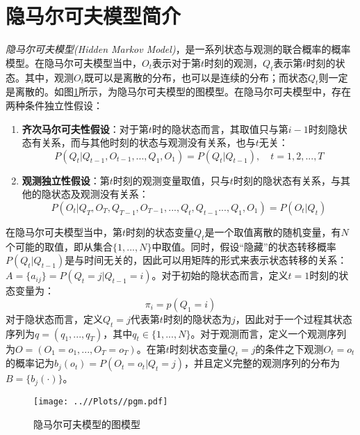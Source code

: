 \documentclass[UTF8, 12pt]{ctexart}
\begin{document}
\section{隐马尔可夫模型简介}
	\emph{隐马尔可夫模型(Hidden Markov Model)}，是一系列状态与观测的联合概率的概率模型\cite{Bilmes1998A}。在隐马尔可夫模型当中，$O_{t}$表示对于第$t$时刻的观测，$Q_{t}$表示第$t$时刻的状态。其中，观测$O_{t}$既可以是离散的分布，也可以是连续的分布；而状态$Q_{t}$则一定是离散的。如图\ref{Fig:1}所示，为隐马尔可夫模型的图模型。在隐马尔可夫模型中，存在两种条件独立性假设：
	\begin{enumerate}
		\item \textbf{齐次马尔可夫性假设}：对于第$t$时的隐状态而言，其取值只与第$i-1$时刻隐状态有关系，而与其他时刻的状态与观测没有关系，也与$t$无关：
		\begin{equation}
			P({Q_t}|{Q_{t - 1}},{O_{t - 1}},...,{Q_1},{O_1}) = P({Q_t}|{Q_{t - 1}}), \quad t=1, 2, ..., T
		\end{equation}
		\item \textbf{观测独立性假设}：第$t$时刻的观测变量取值，只与$t$时刻的隐状态有关系，与其他的隐状态及观测没有关系：
		\begin{equation}
			P({O_t}|{Q_T},{O_T},{Q_{T - 1}},{O_{T - 1}},...,{Q_t},{Q_{t - 1}}...,{Q_1},{O_1}) = P({O_t}|{Q_t})
		\end{equation}
	\end{enumerate}
	在隐马尔可夫模型当中，第$t$时刻的状态变量$Q_{t}$是一个取值离散的随机变量，有$N$个可能的取值，即从集合$ \{1,...,N\}$中取值。同时，假设“隐藏”的状态转移概率$P(Q_{t}|Q_{t-1})$是与时间无关的，因此可以用矩阵的形式来表示状态转移的关系：$A=\{a_{ij}\}=P(Q_{t}=j|Q_{t-1}=i)$。对于初始的隐状态而言，定义$t=1$时刻的状态变量为：
	\begin{equation}
		{\pi_i} = p({Q_1} = i)
	\end{equation}
	对于隐状态而言，定义$Q_{t}=j$代表第$t$时刻的隐状态为$j$，因此对于一个过程其状态序列为$q=(q_{1},...,q_{T})$，其中$q_{t} \in \{1,...,N\}$。对于观测而言，定义一个观测序列为$O=(O_{1}=o_{1},...,O_{T}=o_{T})$。在第$t$时刻状态变量$Q_{t}=j$的条件之下观测$O_{t}=o_{t}$的概率记为$b_{j}(o_{t})=P(O_{t}=o_{t}|Q_{t}=j)$，并且定义完整的观测序列的分布为$B=\{b_{j}(·)\}$。
	\begin{figure}[H]
		\centering
		\texttt{[image: ..//Plots//pgm.pdf]}
		\caption{隐马尔可夫模型的图模型}
		\label{Fig:1}
		\vspace{-0.5em}
	\end{figure}
	
\end{document}
